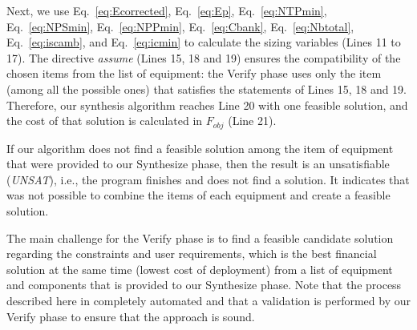 \documentclass[10pt,conference]{IEEEtran}
\begin{document}
Next, we use Eq.~\eqref{eq:Ecorrected}, Eq.~\eqref{eq:Ep}, Eq.~\eqref{eq:NTPmin}, Eq.~\eqref{eq:NPSmin}, Eq.~\eqref{eq:NPPmin}, Eq.~\eqref{eq:Cbank}, Eq.~\eqref{eq:Nbtotal}, Eq.~\eqref{eq:iscamb}, and Eq.~\eqref{eq:icmin} to calculate the sizing variables (Lines 11 to 17). The directive \textit{assume} (Lines 15, 18 and 19) ensures the compatibility of the chosen items from the list of equipment: the {\sc Verify} phase uses only the item (among all the possible ones) that satisfies the statements of Lines 15, 18 and 19. Therefore, our synthesis algorithm reaches Line 20 with one feasible solution, and the cost of that solution is calculated in $F_{obj}$ (Line 21). 

If our algorithm does not find a feasible solution among the item of equipment that were provided to our {\sc Synthesize} phase,  then the result is an unsatisfiable (\textit{UNSAT}), i.e., the program finishes and does not find a solution. It indicates that was not possible to combine the items of each equipment and create a feasible solution. 

The main challenge for the {\sc Verify} phase is to find a feasible candidate solution regarding the constraints and user requirements, which is the best financial solution at the same time (lowest cost of deployment) from a list of equipment and components that is provided to our {\sc Synthesize} phase. 
Note that the process described here in completely automated and that a validation is performed by our {\sc Verify} phase to ensure that the approach is sound.
\end{document}
